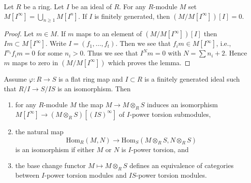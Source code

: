 \begin{lemma}
\label{lemma-divide-by-torsion}
Let $R$ be a ring. Let $I$ be an ideal of $R$. For any $R$-module $M$
set $M[I^\infty] = \bigcup_{n \geq 1} M[I^n]$.
If $I$ is finitely generated, then $(M/M[I^\infty])[I] = 0$.
\end{lemma}

\begin{proof}
Let $m \in M$. If $m$ maps to an element of $(M/M[I^\infty])[I]$
then $Im \subset M[I^\infty]$.
Write $I = (f_1, \ldots, f_t)$. Then we see that
$f_i m \in M[I^\infty]$, i.e., $I^{n_i}f_i m = 0$ for some $n_i > 0$.
Thus we see that $I^Nm = 0$ with $N = \sum n_i + 2$.
Hence $m$ maps to zero in $(M/M[I^\infty])$ which proves the lemma.
\end{proof}

\begin{lemma}
\label{lemma-neighbourhood-equivalence}
Assume $\varphi : R \to S$ is a flat ring map and $I \subset R$ is a
finitely generated ideal such that $R/I \to S/IS$ is an isomorphism. Then
\begin{enumerate}
\item for any $R$-module $M$ the map $M \to M \otimes_R S$ induces
an isomorphism
$M[I^\infty] \to (M \otimes_R S)[(IS)^\infty]$ of $I$-power
torsion submodules,
\item the natural map
$$
\text{Hom}_R(M, N) \longrightarrow \text{Hom}_S(M \otimes_R S, N \otimes_R S)
$$
is an isomorphism if either $M$ or $N$ is $I$-power torsion, and
\item the base change functor $M \mapsto M \otimes_R S$ defines an
equivalence of categories between $I$-power torsion modules
and $IS$-power torsion modules.
\end{enumerate}
\end{lemma}

